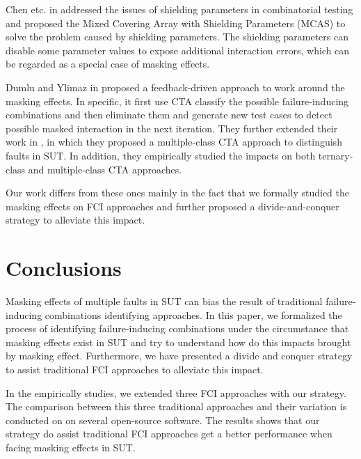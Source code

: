 \documentclass{sig-alternate}
\begin{document}
Chen etc. in \cite{chen2010combinatorial} addressed the issues of shielding parameters in combinatorial testing and proposed the Mixed Covering Array with Shielding Parameters (MCAS) to solve the problem caused by shielding parameters. The shielding parameters can disable some parameter values to expose additional interaction errors, which can be regarded as a special case of masking effects.

Dumlu and Ylimaz in \cite{dumlu2011feedback} proposed a feedback-driven approach to work around the masking effects. In specific, it first use CTA classify the possible failure-inducing combinations and then eliminate them and generate new test cases to detect possible masked interaction in the next iteration. They further extended their work in \cite{yilmaz2013reducing}, in which they proposed a multiple-class CTA approach to distinguish faults in SUT. In addition, they empirically studied the impacts on both ternary-class and multiple-class CTA approaches.

Our work differs from these ones mainly in the fact that we formally studied the masking effects on FCI approaches and further proposed a divide-and-conquer strategy to alleviate this impact.

\section{Conclusions}
Masking effects of multiple faults in SUT can bias the result of traditional failure-inducing combinations identifying approaches. In this paper, we formalized the process of identifying failure-inducing combinations under the circumstance that masking effects exist in SUT and try to understand how do this impacts brought by masking effect. Furthermore, we have presented a divide and conquer strategy to assist traditional FCI approaches to alleviate this impact.


In the empirically studies, we extended three FCI approaches with our strategy. The comparison between this three traditional approaches and their variation is conducted on on several open-source software. The results shows that our strategy do assist traditional FCI approaches get a better performance when facing masking effects in SUT.
\end{document}

